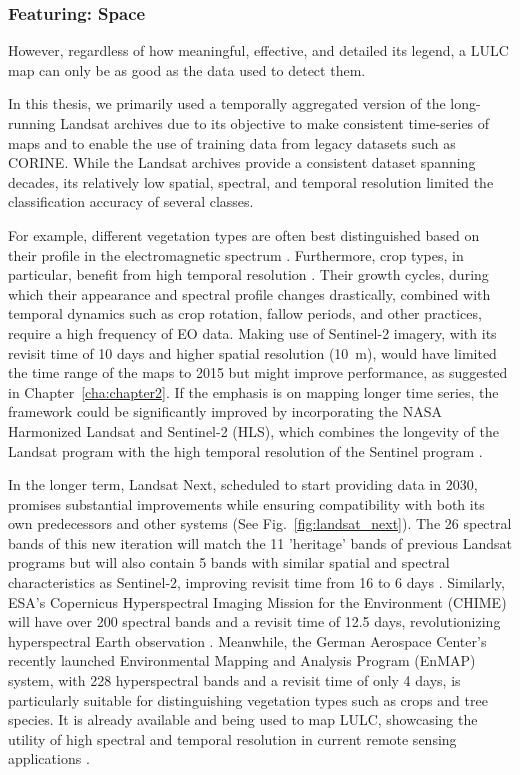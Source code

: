         \subsubsection{Featuring: Space}

            However, regardless of how meaningful, effective, and detailed its legend, a LULC map can only be as good as the data used to detect them. 
            
            In this thesis, we primarily used a temporally aggregated version of the long-running Landsat archives due to its objective to make consistent time-series of maps and to enable the use of training data from legacy datasets such as CORINE. While the Landsat archives provide a consistent dataset spanning decades, its relatively low spatial, spectral, and temporal resolution limited the classification accuracy of several classes. 
            
            For example, different vegetation types are often best distinguished based on their profile in the electromagnetic spectrum \citep{xu2021towards,hennessy2020hyperspectral, neinavaz2021thermal}. Furthermore, crop types, in particular, benefit from high temporal resolution \citep{esch2014differentiation,xu2021towards}. Their growth cycles, during which their appearance and spectral profile changes drastically, combined with temporal dynamics such as crop rotation, fallow periods, and other practices, require a high frequency of EO data. Making use of Sentinel-2 imagery, with its revisit time of 10 days and higher spatial resolution (10~m), would have limited the time range of the maps to 2015 but might improve performance, as suggested in Chapter\@~\ref{cha:chapter2}. If the emphasis is on mapping longer time series, the framework could be significantly improved by incorporating the NASA Harmonized Landsat and Sentinel-2 (HLS), which combines the longevity of the Landsat program with the high temporal resolution of the Sentinel program \citep{claverie2018harmonized}.
            
            In the longer term, Landsat Next, scheduled to start providing data in 2030, promises substantial improvements while ensuring compatibility with both its own predecessors and other systems (See Fig.\@~\ref{fig:landsat_next}). The 26 spectral bands of this new iteration will match the 11 'heritage' bands of previous Landsat programs but will also contain 5 bands with similar spatial and spectral characteristics as Sentinel-2, improving revisit time from 16 to 6 days \citep{USGS2024LandsatNext}. Similarly, ESA's Copernicus Hyperspectral Imaging Mission for the Environment (CHIME) will have over 200 spectral bands and a revisit time of 12.5 days, revolutionizing hyperspectral Earth observation \citep{nieke2023copernicus}. Meanwhile, the German Aerospace Center's recently launched Environmental Mapping and Analysis Program (EnMAP) system, with 228 hyperspectral bands and a revisit time of only 4 days, is particularly suitable for distinguishing vegetation types such as crops and tree species. It is already available and being used to map LULC, showcasing the utility of high spectral and temporal resolution in current remote sensing applications \citep{storch2023enmap, lekka2024appraisal}.
    
